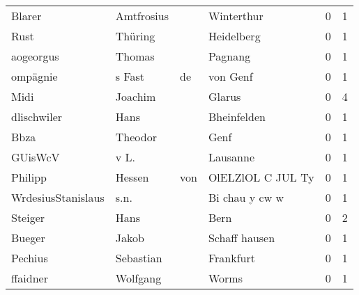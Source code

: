 \begin{center}
\begin{tiny}
\begin{longtabu}{llllrr}
                   Blarer &                         Amtfrosius &             &                                  Winterthur &          0 &         1 \\
                     Rust &                            Thüring &             &                                  Heidelberg &          0 &         1 \\
                aogeorgus &                             Thomas &             &                                     Pagnang &          0 &         1 \\
                 ompägnie &                             s Fast &          de &                                    von Genf &          0 &         1 \\
                     Midi &                            Joachim &             &                                      Glarus &          0 &         4 \\
              dlischwiler &                               Hans &             &                                 Bheinfelden &          0 &         1 \\
                     Bbza &                            Theodor &             &                                        Genf &          0 &         1 \\
                  GUisWcV &                               v L. &             &                                    Lausanne &          0 &         1 \\
                  Philipp &                             Hessen &         von &                           OlELZlOL C JUL Ty &          0 &         1 \\
       WrdesiusStanislaus &                               s.n. &             &                              Bi chau y cw w &          0 &         1 \\
                  Steiger &                               Hans &             &                                        Bern &          0 &         2 \\
                   Bueger &                              Jakob &             &                               Schaff hausen &          0 &         1 \\
                  Pechius &                          Sebastian &             &                                   Frankfurt &          0 &         1 \\
                 ffaidner &                           Wolfgang &             &                                       Worms &          0 &         1 \\

\end{longtabu}
\end{tiny}
\end{center}
